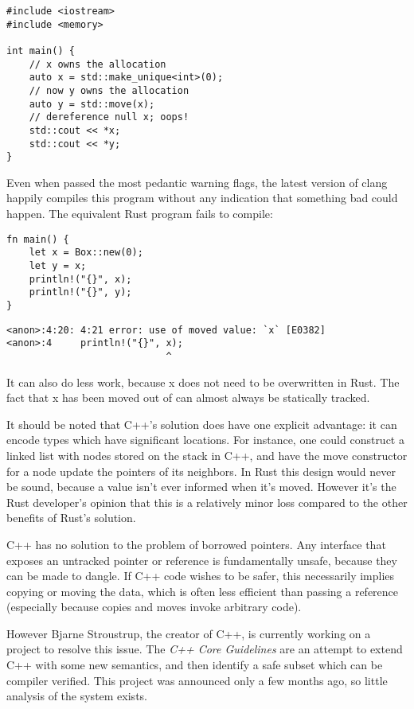 \begin{verbatim}
#include <iostream>
#include <memory>

int main() {
    // x owns the allocation
    auto x = std::make_unique<int>(0);
    // now y owns the allocation
    auto y = std::move(x);
    // dereference null x; oops!
    std::cout << *x;
    std::cout << *y;
}
\end{verbatim}

Even when passed the most pedantic warning flags, the latest version of clang
happily compiles this program without any indication that something bad could
happen. The equivalent Rust program fails to compile:

\begin{verbatim}
fn main() {
    let x = Box::new(0);
    let y = x;
    println!("{}", x);
    println!("{}", y);
}
\end{verbatim}

\begin{verbatim}
<anon>:4:20: 4:21 error: use of moved value: `x` [E0382]
<anon>:4     println!("{}", x);
                            ^
\end{verbatim}

It can also do less work, because x does not need to be overwritten in
Rust. The fact that x has been moved out of can almost always be statically
tracked.

It should be noted that C++'s solution does have one explicit advantage: it
can encode types which have significant locations. For instance, one could
construct a linked list with nodes stored on the stack in C++, and have the
move constructor for a node update the pointers of its neighbors. In Rust
this design would never be sound, because a value isn't ever informed when it's
moved. However it's the Rust developer's opinion that this is a relatively
minor loss compared to the other benefits of Rust's solution.

C++ has no solution to the problem of borrowed pointers. Any interface that
exposes an untracked pointer or reference is fundamentally unsafe, because they
can be made to dangle. If C++ code wishes to be safer, this necessarily implies
copying or moving the data, which is often less efficient than passing a reference
(especially because copies and moves invoke arbitrary code).

However Bjarne Stroustrup, the creator of C++, is currently working on a project
to resolve this issue. The \emph{C++ Core Guidelines} \cite{cppcore} are an attempt to extend
C++ with some new semantics, and then identify a safe subset which can be compiler
verified. This project was announced only a few months ago, so little analysis of the
system exists.

